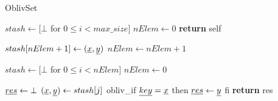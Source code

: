 \begin{algorithm}
\caption{OblivSet}
\label{alg:obliv_set}
\begin{algorithmic}[1]


\State $stash \gets [ \bot $ for $0 \leq i < max\_size]$
\State $nElem \gets 0$
\State \textbf{return} self
\EndProcedure

\State

\State $stash[nElem + 1] \gets (\underline{ x }, \underline{ y })$
\State $nElem \gets nElem + 1$
\EndProcedure

\State

\State $stash \gets [ \bot $ for $0 \leq i < nElem]$
\State $nElem \gets 0$
\EndProcedure

\State

\State $\underline{ res } \gets \bot$
    \State $(\underline{ x }, \underline{ y }) \gets stash[j]$
    \State obliv\_if $\underline{ key } = \underline{ x }$ then
        \State $\underline{ res } \gets \underline{ y }$
    \State fi
\EndFor
\State \textbf{return} res
\EndProcedure

\end{algorithmic}
\end{algorithm}


